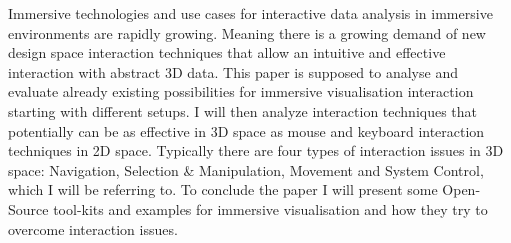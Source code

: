 Immersive technologies and use cases for interactive data analysis in immersive environments are rapidly growing. Meaning there is a growing demand of new design space interaction techniques that allow an intuitive and effective interaction with abstract 3D data. This paper is supposed to analyse and evaluate already existing possibilities for immersive visualisation interaction starting with different setups. I will then analyze interaction techniques that potentially can be as effective in 3D space as mouse and keyboard interaction techniques in 2D space. Typically there are four types of interaction issues in 3D space: Navigation, Selection & Manipulation, Movement and System Control, which I will be referring to. To conclude the paper I will present some Open-Source tool-kits and examples for immersive visualisation and how they try to overcome interaction issues.